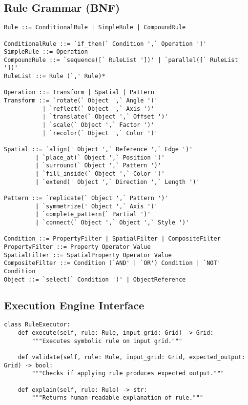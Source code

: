 \documentclass[12pt]{article}
\begin{document}
\subsection{Rule Grammar (BNF)}
\begin{verbatim}
Rule ::= ConditionalRule | SimpleRule | CompoundRule

ConditionalRule ::= `if_then(` Condition ',` Operation ')'
SimpleRule ::= Operation
CompoundRule ::= `sequence([` RuleList '])' | `parallel([` RuleList '])'
RuleList ::= Rule (`,' Rule)*

Operation ::= Transform | Spatial | Pattern
Transform ::= `rotate(` Object ',` Angle ')'
           | `reflect(` Object ',` Axis ')'
           | `translate(` Object ',` Offset ')'
           | `scale(` Object ',` Factor ')'
           | `recolor(` Object ',` Color ')'
           
Spatial ::= `align(' Object ',` Reference ',` Edge ')'
         | `place_at(` Object ',` Position ')'
         | `surround(` Object ',` Pattern ')'
         | `fill_inside(` Object ',` Color ')'
         | `extend(' Object ',` Direction ',` Length ')'
         
Pattern ::= `replicate(` Object ',` Pattern ')'
         | `symmetrize(' Object ',` Axis ')'
         | `complete_pattern(` Partial ')'
         | `connect(` Object ',` Object ',` Style ')'

Condition ::= PropertyFilter | SpatialFilter | CompositeFilter
PropertyFilter ::= Property Operator Value
SpatialFilter ::= SpatialProperty Operator Value
CompositeFilter ::= Condition (`AND' | `OR') Condition | `NOT' Condition
Object ::= `select(` Condition ')' | ObjectReference
\end{verbatim}

\subsection{Execution Engine Interface}
\begin{verbatim}
class RuleExecutor:
    def execute(self, rule: Rule, input_grid: Grid) -> Grid:
        """Executes symbolic rule on input grid."""
        
    def validate(self, rule: Rule, input_grid: Grid, expected_output: Grid) -> bool:
        """Checks if applying rule produces expected output."""
        
    def explain(self, rule: Rule) -> str:
        """Returns human-readable explanation of rule."""
\end{verbatim}
\end{document}
